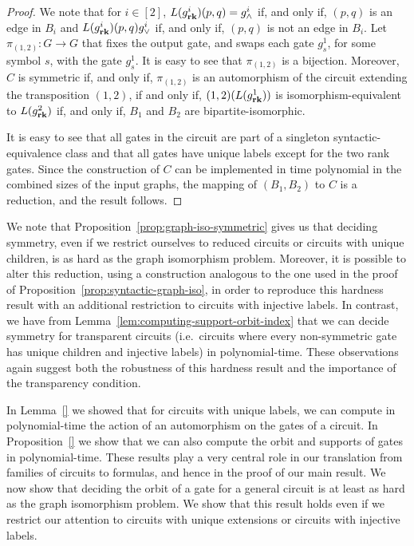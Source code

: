 \documentclass[../paper.tex]{subfiles}
\begin{document}
\begin{proof}
  We note that for $i \in [2]$, $L(g^i_{\text{\textbf{rk}}})(p,q)= g^i_\land$ if, and only
  if, $(p,q)$ is an edge in $B_i$ and $L(g^i_{\text{\textbf{rk}}})(p,q) g^i_\lor$ if, and
  only if, $(p,q)$ is not an edge in $B_i$. Let $\pi_{(1,2)} : G \rightarrow G$
  that fixes the output gate, and swaps each gate $g^1_s$, for some symbol $s$,
  with the gate $g^1_s$. It is easy to see that $\pi_{(1,2)}$ is a bijection.
  Moreover, $C$ is symmetric if, and only if, $\pi_{(1,2)}$ is an automorphism
  of the circuit extending the transposition $(1,2)$, if and only if, $(1,2)
  (L(g^1_{\text{\textbf{rk}}}))$ is isomorphism-equivalent to $L(g^2_{\text{\textbf{rk}}})$ if, and only
  if, $B_1$ and $B_2$ are bipartite-isomorphic.
 
  It is easy to see that all gates in the circuit are part of a singleton
  syntactic-equivalence class and that all gates have unique labels except for
  the two rank gates. Since the construction of $C$ can be implemented in time
  polynomial in the combined sizes of the input graphs, the mapping of $(B_1,
  B_2)$ to $C$ is a reduction, and the result follows.
\end{proof}

We note that Proposition~\ref{prop:graph-iso-symmetric} gives us that deciding
symmetry, even if we restrict ourselves to reduced circuits or circuits with
unique children, is as hard as the graph isomorphism problem. Moreover, it is
possible to alter this reduction, using a construction analogous to the one used
in the proof of Proposition~\ref{prop:syntactic-graph-iso}, in order to
reproduce this hardness result with an additional restriction to circuits with
injective labels. In contrast, we have from
Lemma~\ref{lem:computing-support-orbit-index} that we can decide symmetry for
transparent circuits (i.e.\ circuits where every non-symmetric gate has unique
children and injective labels) in polynomial-time. These observations again
suggest both the robustness of this hardness result and the importance of the
transparency condition.

In Lemma~\ref{} we showed that for circuits with unique labels, we can compute
in polynomial-time the action of an automorphism on the gates of a circuit. In
Proposition~\ref{} we show that we can also compute the orbit and supports of
gates in polynomial-time. These results play a very central role in our
translation from families of circuits to formulas, and hence in the proof of our
main result. We now show that deciding the orbit of a gate for a general circuit
is at least as hard as the graph isomorphism problem. We show that this result
holds even if we restrict our attention to circuits with unique extensions or
circuits with injective labels.
\end{document}

